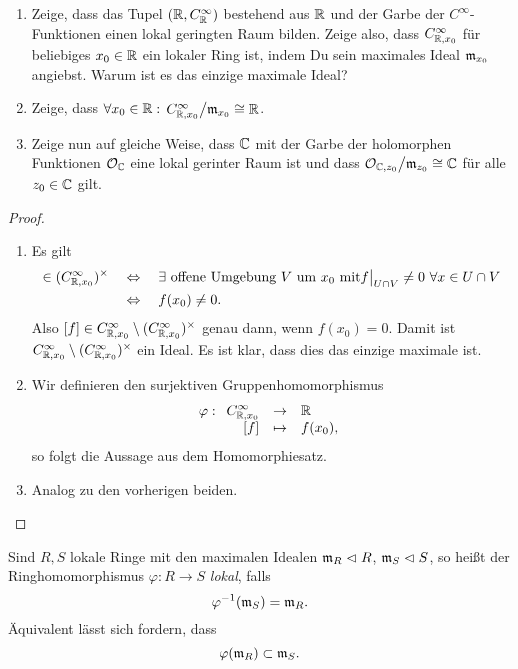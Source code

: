 \begin{uebung}
	\begin{enumerate}
	  \item Zeige, dass das Tupel $(\mathbb{R}, C_\mathbb{R}^\infty)$ bestehend aus $\mathbb{R}$
	  	und der Garbe der $C^\infty$-Funktionen einen lokal geringten Raum
	  	bilden. Zeige also, dass $C_{\mathbb{R},x_0}^\infty$ für beliebiges
	  	$x_0 \in \mathbb{R}$ ein lokaler Ring ist, indem Du sein maximales Ideal
	  	$\mathfrak{m}_{x_0}$ angiebst. Warum ist es das einzige maximale Ideal?
	  \item Zeige, dass $\forall x_0 \in \mathbb{R}:$ 
	  	$C_{\mathbb{R},x_0}^\infty \big/ \mathfrak{m}_{x_0} \cong\mathbb{R}$.
	  \item Zeige nun auf gleiche Weise, dass $\mathbb{C}$ mit der Garbe der 
	 	holomorphen Funktionen $\mathcal{O}_\mathbb{C}$ eine lokal gerinter Raum ist
	 	und dass $\mathcal{O}_{\mathbb{C},z_0} \big/ \mathfrak{m}_{z_0} \cong \mathbb{C}$ für alle
	 	$z_0 \in \mathbb{C}$ gilt.
	\end{enumerate}
\end{uebung}
\begin{proof}
	\begin{enumerate}
	  \item Es gilt
	  \begin{align*}
	  	[f:U\to \R] \in (C_{\R,x_0}^\infty)^\times
		  	\quad &\Leftrightarrow\quad
		  	\exists \text{ offene Umgebung $V$ um $x_0$ mit}
		  	f\rest{U\cap V} \neq 0 \ \forall x \in U\cap V\\
	  	&\Leftrightarrow\quad
	  		f(x_0) \neq 0.
	  \end{align*}
	  Also $[f] \in C_{\mathbb{R},x_0}^\infty \setminus (C_{\mathbb{R},x_0}^\infty)^\times$
	  genau dann, wenn $f(x_0) = 0$.
	  Damit ist $C_{\mathbb{R},x_0}^\infty \setminus (C_{\mathbb{R},x_0}^\infty)^\times$
	  ein Ideal. Es ist klar, dass dies das einzige maximale ist.
	  \item 
	  Wir definieren den surjektiven Gruppenhomomorphismus
	  \[
	  	\varphi: \funcdef{ C_{\R,x_0}^\infty & \to & \R\\
	  		{[f]} & \mapsto & f(x_0),}
	  \]
	  so folgt die Aussage aus dem Homomorphiesatz.
	  \item
	  Analog zu den vorherigen beiden.
	\end{enumerate}
\end{proof}

\begin{definition}
	Sind $R,S$ lokale Ringe mit den maximalen Idealen
	$\mathfrak{m}_R \vartriangleleft R$, $\mathfrak{m}_S \vartriangleleft S$, so heißt der Ringhomomorphismus
	$\varphi: R\to S$ \emph{lokal},
	falls
	\[\varphi^{-1} (\mathfrak{m}_S) = \mathfrak{m}_R .\]
	Äquivalent lässt sich fordern, dass
	\[\varphi(\mathfrak{m}_R) \subset \mathfrak{m}_S.\]
\end{definition}

